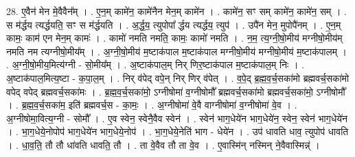 \documentclass[17pt]{extarticle}
\begin{document}
28. ए॒वैन॑ मेन मे॒वैवैन᳚म् । . ए॒न॒म् कामे॑न॒ कामे॑नैन मेन॒म् कामे॑न । . कामे॑न॒ सꣳ सम् कामे॑न॒ कामे॑न॒ सम् । . स म॑र्द्धय त्यर्द्धयति॒ सꣳ स म॑र्द्धयति । . अ॒र्द्ध॒य॒ त्युपोपा᳚ र्द्धय त्यर्द्धय॒ त्युप॑ । . उपै॑न मेन॒ मुपोपै॑नम् । . ए॒न॒म् कामः॒ काम॑ एन मेन॒म् कामः॑ । . कामो॑ नमति नमति॒ कामः॒ कामो॑ नमति । . न॒म॒ त्य॒ग्नी॒षो॒मीय॑ मग्नीषो॒मीय॑म् नमति नम त्यग्नीषो॒मीय᳚म् । . अ॒ग्नी॒षो॒मीय॑ म॒ष्टाक॑पाल म॒ष्टाक॑पाल मग्नीषो॒मीय॑ मग्नीषो॒मीय॑ म॒ष्टाक॑पालम् । . अ॒ग्नी॒षो॒मीय॒मित्य॑ग्नी - सो॒मीय᳚म् । . अ॒ष्टाक॑पाल॒म् निर् णिर॒ष्टाक॑पाल म॒ष्टाक॑पाल॒म् निः । . अ॒ष्टाक॑पाल॒मित्य॒ष्टा - क॒पा॒ल॒म् । . निर् व॑पेद् वपे॒न् निर् णिर् व॑पेत् । . व॒पे॒द् ब्र॒ह्म॒व॒र्च॒सका॑मो ब्रह्मवर्च॒सका॑मो वपेद् वपेद् ब्रह्मवर्च॒सका॑मः । . ब्र॒ह्म॒व॒र्च॒सका॑मो॒ ऽग्नीषोमा॑ व॒ग्नीषोमौ᳚ ब्रह्मवर्च॒सका॑मो ब्रह्मवर्च॒सका॑मो॒ ऽग्नीषोमौ᳚ । . ब्र॒ह्म॒व॒र्च॒सका॑म॒ इति॑ ब्रह्मवर्च॒स - का॒मः॒ । . अ॒ग्नीषोमा॑ वे॒वै वाग्नीषोमा॑ व॒ग्नीषोमा॑ वे॒व । . अ॒ग्नीषोमा॒वित्य॒ग्नी - सोमौ᳚ । . ए॒व स्वेन॒ स्वेनै॒वैव स्वेन॑ । . स्वेन॑ भाग॒धेये॑न भाग॒धेये॑न॒ स्वेन॒ स्वेन॑ भाग॒धेये॑न । . भा॒ग॒धेये॒नोपोप॑ भाग॒धेये॑न भाग॒धेये॒नोप॑ । . भा॒ग॒धेये॒नेति॑ भाग - धेये॑न । . उप॑ धावति धाव॒ त्युपोप॑ धावति । . धा॒व॒ति॒ तौ तौ धा॑वति धावति॒ तौ । . ता वे॒वैव तौ ता वे॒व । . ए॒वास्मि॑न् नस्मिन् ने॒वैवास्मिन्न्॑ । \newline
\end{document}
